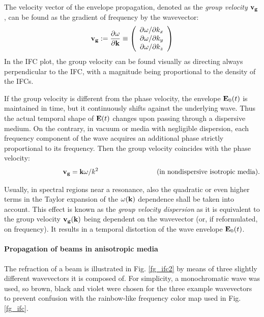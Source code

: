 The velocity vector of the envelope propagation, denoted as the \textit{group velocity} ${\mathbf{v_g}}$, can be found as the gradient of frequency by the wavevector: %
\begin{equation} {\mathbf{v_g}} := \frac{\partial \omega}{\partial {\mathbf{k}}} \equiv 
\left(\begin{array}{c} 
	\partial \omega/\partial k_x \\ 
	\partial \omega/\partial k_y \\ 
	\partial \omega/\partial k_z \\ 
	\end{array} \right)
 \label{eq_vg}\end{equation}
In the IFC plot, the group velocity can be found visually as directing always perpendicular to the IFC, with a magnitude being proportional to the density of the IFCs.

If the group velocity is different from the phase velocity, the envelope $\mathbf{E}_0(t)$ is maintained in time, but it continuously shifts against the underlying wave. Thus the actual temporal shape of $\mathbf{E}(t)$ changes upon passing through a dispersive medium.
On the contrary, in vacuum or media with negligible dispersion, each frequency component of the wave acquires an additional phase strictly proportional to its frequency. Then the group velocity coincides with the phase velocity: 
$$\hspace{3cm}\vg = \kk \omega / k^2 \hspace{3cm} \text{(in nondispersive isotropic media)}.$$

Usually, in spectral regions near a resonance, also the quadratic or even higher terms in the Taylor expansion of the $\omega({\mathbf{k}})$ dependence shall be taken into account. This effect is known as the \textit{group velocity dispersion} as it is equivalent to the group velocity ${\mathbf{v_g}}({\mathbf{k}})$ being dependent on the wavevector (or, if reformulated, on frequency). It results in a temporal distortion of the wave envelope $\mathbf{E}_0(t)$.  %
\paragraph{Propagation of beams in anisotropic media}  %
The refraction of a beam is illustrated in Fig. \ref{fg_ifc2} by means of three slightly different wavevectors it is composed of. For simplicity, a monochromatic wave was used, so brown, black and violet were chosen for the three example wavevectors to prevent confusion with the rainbow-like frequency color map used in Fig. \ref{fg_ifc}. 

